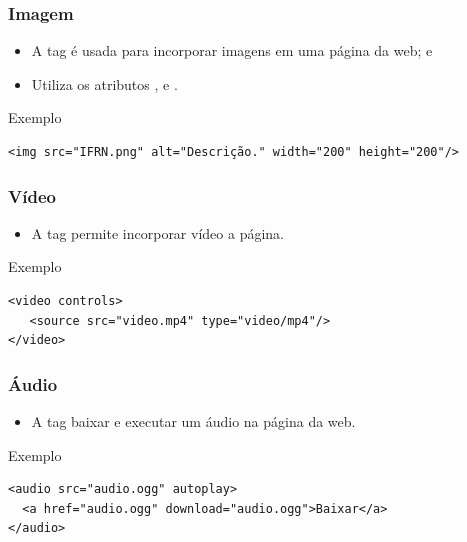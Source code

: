 \documentclass[aspectratio=169]{beamer} %
\begin{document}
\begin{frame}[fragile]
	\frametitle{Imagem}
	
	\begin{itemize}
		\item A tag  é usada para incorporar imagens em uma página da web; e
		\item Utiliza os atributos ,   e .
	\end{itemize}\vfill
	
	\begin{exampleblock}{Exemplo}
		\begin{lstlisting}
<img src="IFRN.png" alt="Descrição." width="200" height="200"/>
		\end{lstlisting}
	\end{exampleblock}
\end{frame}

\begin{frame}[fragile]
	\frametitle{Vídeo}
	
	\begin{itemize}
		\item A tag  permite incorporar vídeo a página.
	\end{itemize}\vfill
	
	\begin{exampleblock}{Exemplo}
		\begin{lstlisting}
<video controls>
   <source src="video.mp4" type="video/mp4"/>
</video>
		\end{lstlisting}
	\end{exampleblock}
\end{frame}

\begin{frame}[fragile]
	\frametitle{Áudio}
	
	\begin{itemize}
		\item A tag  baixar e executar um áudio na página da web.
	\end{itemize}\vfill
	
	\begin{exampleblock}{Exemplo}
		\begin{lstlisting}
<audio src="audio.ogg" autoplay>
  <a href="audio.ogg" download="audio.ogg">Baixar</a>
</audio>
		\end{lstlisting}
	\end{exampleblock}
\end{frame}
\end{document}
